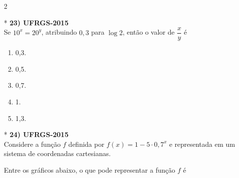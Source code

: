 \documentclass[11pt,a4paper]{article}
\begin{document}
\begin{paracol}{2}
\switchcolumn[1]
\vspace{7cm}

\switchcolumn[0]*
\textbf{23) UFRGS-2015} \\
Se $10^x = 20^y$, atribuindo $0{,}3$ para $\log 2$, então o valor de $\dfrac{x}{y}$ é

\begin{enumerate}[label=(\Alph*)]
    \item 0,3.
    \item 0,5.
    \item 0,7.
    \item 1.
    \item 1,3.
\end{enumerate}
\vspace{0.4cm}

\switchcolumn[1]
\vspace{6cm}

\switchcolumn[0]*
\textbf{24) UFRGS-2015} \\
Considere a função $f$ definida por $f(x) = 1 - 5 \cdot 0{,}7^x$ e representada em um sistema de coordenadas cartesianas.

Entre os gráficos abaixo, o que pode representar a função $f$ é


\end{paracol}
\end{document}
